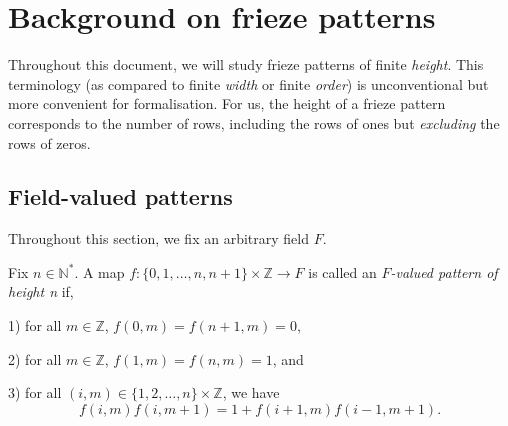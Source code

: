 \chapter{Background on frieze patterns}\label{s:fp}
Throughout this document, we will study frieze patterns of finite {\it height}. This terminology (as compared to finite {\it width} or 
finite {\it order}) is unconventional but more convenient for formalisation. For us, the height of a frieze pattern corresponds 
to the number of rows, including the rows of ones but {\it excluding} the rows of zeros.
\section{Field-valued patterns}
Throughout this section, we fix an arbitrary field $F$. 


\begin{definition}
    \label{def:pattern_n}
    \leanok
        Fix $n \in \mathbb{N}^*$. A map $f : \{0,1,\ldots , n,n+1\} \times \mathbb{Z} \longrightarrow F$ is called
        an \textit{$F$-valued pattern of height n} if, 
        
        1) for all $m \in \mathbb{Z}$, $ f(0,m) = f (n+1,m) = 0$, 
        
        2) for all $m \in \mathbb{Z}$, $ f(1,m) = f (n,m) = 1$, and 
        
        3) for all $(i,m) \in \{1,2,\ldots , n\} \times \mathbb{Z}$, we have
        \begin{equation}\label{eq:diamond}
            f(i,m) f(i,m+1) = 1 + f(i+1,m) f(i-1, m+1).
        \end{equation}
    \end{definition}

